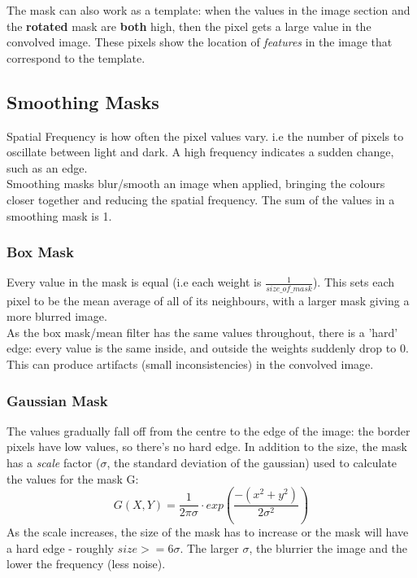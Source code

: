 The mask can also work as a template: when the values in the image section and the \textbf{rotated} mask are \textbf{both} high, then the pixel gets a large value in the convolved image. These pixels show the location of \emph{features} in the image that correspond to the template. \\


\subsection{Smoothing Masks}
Spatial Frequency is how often the pixel values vary. i.e the number of pixels to oscillate between light and dark. A high frequency indicates a sudden change, such as an edge. \\

Smoothing masks blur/smooth an image when applied, bringing the colours closer together and reducing the spatial frequency. The sum of the values in a smoothing mask is 1. 

\subsubsection{Box Mask}
Every value in the mask is equal (i.e each weight is $\frac{1}{size\_of\_mask}$). This sets each pixel to be the mean average of all of its neighbours, with a larger mask giving a more blurred image. \\

As the box mask/mean filter has the same values throughout, there is a 'hard' edge: every value is the same inside, and outside the weights suddenly drop to 0. This can produce artifacts (small inconsistencies) in the convolved image.

\subsubsection{Gaussian Mask}
The values gradually fall off from the centre to the edge of the image: the border pixels have low values, so there's no hard edge. In addition to the size, the mask has a \emph{scale} factor ($\sigma$, the standard deviation of the gaussian) used to calculate the values for the mask G:
\begin{equation}
    G(X,Y) = \frac{1}{2\pi\sigma} \cdot exp \left( \frac{-(x^2+y^2)}{2\sigma^2} \right)
\end{equation}
As the scale increases, the size of the mask has to increase or the mask will have a hard edge - roughly $size >= 6\sigma$. The larger $\sigma$, the blurrier the image and the lower the frequency (less noise).\\

